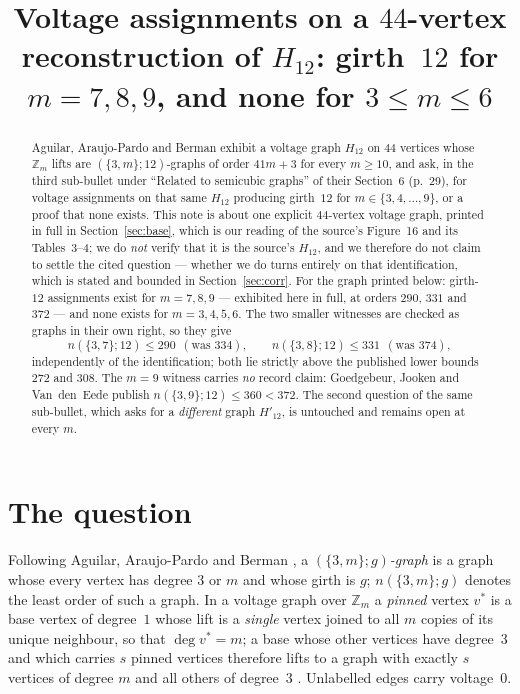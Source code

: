 \documentclass[11pt]{amsart}
\title[A $44$-vertex reconstruction of $H_{12}$, for $m\le 9$]
{Voltage assignments on a $44$-vertex reconstruction of $H_{12}$:
 girth~$12$ for $m=7,8,9$, and none for $3\le m\le 6$}
\date{}
\theoremstyle{remark}
\begin{document}
\begin{abstract}
Aguilar, Araujo-Pardo and Berman exhibit a voltage graph $H_{12}$ on $44$ vertices whose
$\mathbb{Z}_m$ lifts are $(\{3,m\};12)$-graphs of order $41m+3$ for every $m\ge 10$, and ask,
in the third sub-bullet under ``Related to semicubic graphs'' of their Section~6 (p.~29), for
voltage assignments on that same $H_{12}$ producing girth~$12$ for $m\in\{3,4,\dots,9\}$, or a
proof that none exists. This note is about one explicit $44$-vertex voltage graph, printed in
full in Section~\ref{sec:base}, which is our reading of the source's Figure~16 and its
Tables~3--4; we do \emph{not} verify that it is the source's $H_{12}$, and we therefore do not
claim to settle the cited question --- whether we do turns entirely on that identification,
which is stated and bounded in Section~\ref{sec:corr}. For the graph printed below: girth-$12$
assignments exist for $m=7,8,9$ --- exhibited here in full, at orders $290$, $331$ and $372$ ---
and none exists for $m=3,4,5,6$. The two smaller witnesses are checked as graphs in their own
right, so they give
\[
 n(\{3,7\};12)\le 290\ \ (\text{was }334),
 \qquad
 n(\{3,8\};12)\le 331\ \ (\text{was }374),
\]
independently of the identification; both lie strictly above the published lower bounds $272$
and $308$. The $m=9$ witness carries \emph{no} record claim: Goedgebeur, Jooken and
Van~den~Eede publish $n(\{3,9\};12)\le 360<372$. The second question of the same sub-bullet,
which asks for a \emph{different} graph $H'_{12}$, is untouched and remains open at every $m$.
\end{abstract}

\maketitle

\section{The question}\label{sec:q}

Following Aguilar, Araujo-Pardo and Berman \cite{AAB}, a \emph{$(\{3,m\};g)$-graph} is a graph
whose every vertex has degree $3$ or $m$ and whose girth is $g$; $n(\{3,m\};g)$ denotes the
least order of such a graph. In a voltage graph over $\mathbb{Z}_m$ a \emph{pinned} vertex
$v^{*}$ is a base vertex of degree~$1$ whose lift is a \emph{single} vertex joined to all $m$
copies of its unique neighbour, so that $\deg v^{*}=m$; a base whose other vertices have
degree~$3$ and which carries $s$ pinned vertices therefore lifts to a graph with exactly $s$
vertices of degree $m$ and all others of degree~$3$ \cite[Remark~3.1]{AAB}. Unlabelled edges
carry voltage~$0$.
\end{document}
